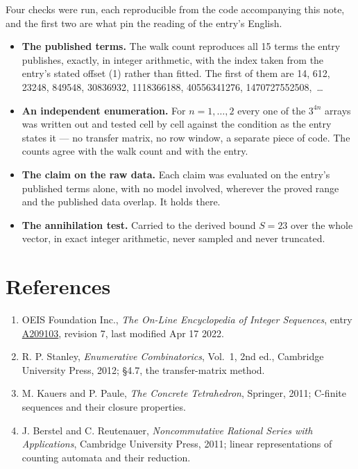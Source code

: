 \documentclass[11pt]{article}
\theoremstyle{definition}
\begin{document}
Four checks were run, each reproducible from the code accompanying this note, and the first two are what pin the reading of the entry's English.

\begin{itemize}

\item {\bfseries The published terms.} The walk count reproduces all 15 terms the entry publishes, exactly, in integer arithmetic, with the index taken from the entry's stated offset (1) rather than fitted. The first of them are 14, 612, 23248, 849548, 30836932, 1118366188, 40556341276, 1470727552508,~\dots

\item {\bfseries An independent enumeration.} For $n = 1,\dots,2$ every one of the $3^{4n}$ arrays was written out and tested cell by cell against the condition as the entry states it --- no transfer matrix, no row window, a separate piece of code. The counts agree with the walk count and with the entry.

\item {\bfseries The claim on the raw data.} Each claim was evaluated on the entry's published terms alone, with no model involved, wherever the proved range and the published data overlap. It holds there.

\item {\bfseries The annihilation test.} Carried to the derived bound $S = 23$ over the whole vector, in exact integer arithmetic, never sampled and never truncated.

\end{itemize}

\section{References}

\begin{enumerate}

\item OEIS Foundation Inc., \emph{The On-Line Encyclopedia of Integer Sequences}, entry \href{https://oeis.org/A209103}{A209103}, revision 7, last modified Apr 17 2022.

\item R. P. Stanley, \emph{Enumerative Combinatorics}, Vol.~1, 2nd ed., Cambridge University Press, 2012; \S4.7, the transfer-matrix method.

\item M. Kauers and P. Paule, \emph{The Concrete Tetrahedron}, Springer, 2011; C-finite sequences and their closure properties.

\item J. Berstel and C. Reutenauer, \emph{Noncommutative Rational Series with Applications}, Cambridge University Press, 2011; linear representations of counting automata and their reduction.

\end{enumerate}
\end{document}
